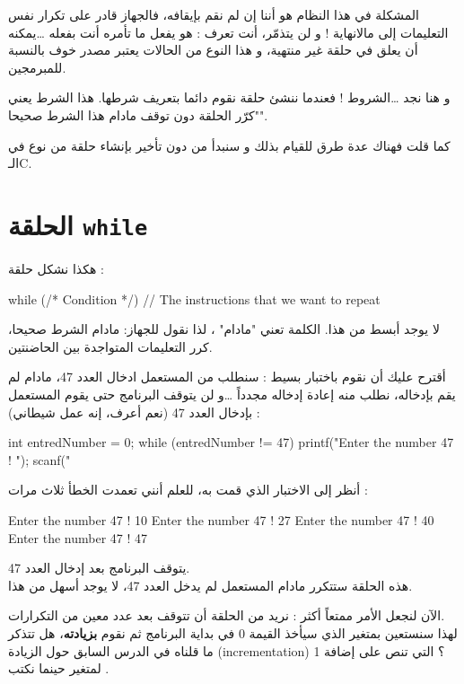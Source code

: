 المشكلة في هذا النظام هو أننا إن لم نقم بإيقافه، فالجهاز قادر على تكرار نفس التعليمات إلى مالانهاية ! و لن يتذمّر، أنت تعرف : هو يفعل ما تأمره أنت بفعله \dots يمكنه أن يعلق في حلقة غير منتهية، و هذا النوع من الحالات يعتبر مصدر خوف  بالنسبة للمبرمجين.

و هنا نجد \dots الشروط ! فعندما ننشئ حلقة نقوم دائما بتعريف شرطها. هذا الشرط يعني "كرّر الحلقة دون توقف مادام هذا الشرط صحيحا".

كما قلت فهناك عدة طرق للقيام بذلك و سنبدأ من دون تأخير بإنشاء حلقة من نوع 
في الـ\textenglish{C}.

\section{الحلقة \texttt{while}}

هكذا نشكل حلقة 
 :

\begin{Csource}
while (/* Condition */)
{
	// The instructions that we want to repeat
}
\end{Csource}

لا يوجد أبسط من هذا. الكلمة 
تعني "مادام" ، لذا نقول للجهاز: مادام الشرط صحيحا، كرر التعليمات المتواجدة بين الحاضنتين.

أقترح عليك أن نقوم باختبار بسيط : سنطلب من المستعمل ادخال العدد 47، مادام لم يقم بإدخاله، نطلب منه إعادة إدخاله مجدداً \dots و لن يتوقف البرنامج حتى يقوم المستعمل بإدخال العدد 47 (نعم أعرف، إنه عمل شيطاني) :

\begin{Csource}
int entredNumber = 0;
while (entredNumber != 47)
{
	printf("Enter the number 47 ! ");
	scanf("%
}
\end{Csource}

أنظر إلى الاختبار الذي قمت به، للعلم أنني تعمدت الخطأ ثلاث مرات :

\begin{Console}
Enter the number 47 ! 10
Enter the number 47 ! 27
Enter the number 47 ! 40
Enter the number 47 ! 47
\end{Console}

يتوقف البرنامج بعد إدخال العدد 47.\\
 هذه الحلقة 
 ستتكرر مادام المستعمل لم يدخل العدد 47، لا يوجد أسهل من هذا.
 
الآن لنجعل الأمر ممتعاً أكثر : نريد من الحلقة أن تتوقف بعد عدد معين من التكرارات.\\
لهذا سنستعين بمتغير
الذي سيأخذ القيمة 0 في بداية البرنامج ثم نقوم 
\textbf{بزيادته}،
 هل تتذكر ما قلناه في الدرس السابق حول الزيادة 
(\textenglish{incrementation}) ؟
 التي تنص على إضافة 1 لمتغير حينما نكتب
.

